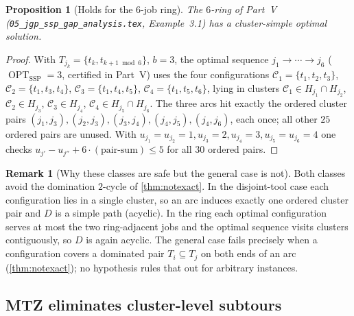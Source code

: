 \documentclass[11pt,a4paper]{article}
\theoremstyle{plain}
\newtheorem{proposition}[theorem]{Proposition}
\theoremstyle{definition}
\newtheorem{remark}[theorem]{Remark}
\DeclareMathOperator{\OPT}{OPT}
\newcommand{\OSSP}{\OPT_{\mathrm{SSP}}}
\begin{document}
\begin{thmbox}
	\begin{proposition}[Holds for the $6$-job ring]
		\label{prop:exchange_ring}
		The $6$-ring of Part~V (\texttt{05\_jgp\_ssp\_gap\_analysis.tex}, Example~3.1) has a
		cluster-simple optimal solution.
	\end{proposition}
\end{thmbox}
\begin{proofbox}
	\begin{proof}
		With $T_{j_k}=\{t_k,t_{k+1\bmod 6}\}$, $b=3$, the optimal sequence
		$j_1\to\cdots\to j_6$ ($\OSSP=3$, certified in Part~V) uses the four configurations
		$\mathcal{C}_1=\{t_1,t_2,t_3\}$, $\mathcal{C}_2=\{t_1,t_3,t_4\}$,
		$\mathcal{C}_3=\{t_1,t_4,t_5\}$, $\mathcal{C}_4=\{t_1,t_5,t_6\}$, lying in clusters
		$\mathcal{C}_1\in H_{j_1}\cap H_{j_2}$, $\mathcal{C}_2\in H_{j_3}$,
		$\mathcal{C}_3\in H_{j_4}$, $\mathcal{C}_4\in H_{j_5}\cap H_{j_6}$. The three arcs hit
		exactly the ordered cluster pairs $(j_1,j_3),(j_2,j_3),(j_3,j_4),(j_4,j_5),(j_4,j_6)$,
		each once; all other $25$ ordered pairs are unused. With
		$u_{j_1}=u_{j_2}=1,u_{j_3}=2,u_{j_4}=3,u_{j_5}=u_{j_6}=4$ one checks
		$u_{j'}-u_{j''}+6\cdot(\text{pair-sum})\le 5$ for all $30$ ordered pairs.
	\end{proof}
\end{proofbox}

\begin{remark}[Why these classes are safe but the general case is not]
	Both classes avoid the domination $2$-cycle of \cref{thm:notexact}. In the disjoint-tool
	case each configuration lies in a single cluster, so an arc induces exactly one ordered
	cluster pair and $D$ is a simple path (acyclic). In the ring each optimal configuration
	serves at most the two ring-adjacent jobs and the optimal sequence visits clusters
	contiguously, so $D$ is again acyclic. The general case fails precisely when a configuration
	covers a dominated pair $T_i\subseteq T_j$ on both ends of an arc (\cref{thm:notexact}); no
	hypothesis rules that out for arbitrary instances.
\end{remark}

\subsection{MTZ eliminates cluster-level subtours}
\end{document}
